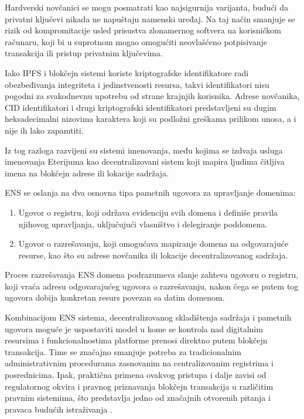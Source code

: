 Hardverski novčanici se mogu posmatrati kao najsigurnija varijanta, budući da privatni ključevi nikada ne napuštaju namenski uređaj. Na taj način smanjuje se rizik od kompromitacije usled prisustva zlonamernog softvera na korisničkom računaru, koji bi u suprotnom mogao omogućiti neovlašćeno potpisivanje transakcija ili pristup privatnim ključevima.

Iako IPFS i blokčejn sistemi koriste kriptografske identifikatore radi obezbeđivanja integriteta i jedinstvenosti resursa, takvi identifikatori nisu pogodni za svakodnevnu upotrebu od strane krajnjih korisnika. Adrese novčanika, CID identifikatori i drugi kriptografski identifikatori predstavljeni su dugim heksadecimalni nizovima karaktera koji su podložni greškama prilikom unosa, a i nije ih lako zapamtiti. 

Iz tog razloga razvijeni su sistemi imenovanja, među kojima se izdvaja usluga imenovanja Eterijuma  \cite{xia2021ethereum} kao decentralizovani sistem koji mapira ljudima čitljiva imena na blokčejn adrese ili lokacije sadržaja.

ENS se oslanja na dva osnovna tipa pametnih ugovora za upravljanje domenima:

\begin{enumerate}
\item Ugovor o registru, koji održava evidenciju svih domena i definiše pravila njihovog upravljanja, uključujući vlasništvo i delegiranje poddomena.

\item Ugovor o razrešavanju, koji omogućava mapiranje domena na odgovarajuće resurse, kao što su adrese novčanika ili lokacije decentralizovanog sadržaja.
\end{enumerate}

Proces razrešavanja ENS domena podrazumeva slanje zahteva ugovoru o registru, koji vraća adresu odgovarajućeg ugovora o razrešavanju, nakon čega se putem tog ugovora dobija konkretan resurs povezan sa datim domenom.

Kombinacijom ENS sistema, decentralizovanog skladištenja sadržaja i pametnih ugovora moguće je uspostaviti model u kome se kontrola nad digitalnim resursima i funkcionalnostima platforme prenosi direktno putem blokčejn transakcija. Time se značajno smanjuje potreba za tradicionalnim administrativnim procedurama zasnovanim na centralizovanim registrima i posrednicima. Ipak, praktična primena ovakvog pristupa i dalje zavisi od regulatornog okvira i pravnog priznavanja blokčejn transakcija u različitim pravnim sistemima, što predstavlja jedno od značajnih otvorenih pitanja i pravaca budućih istraživanja \cite{finck2018blockchain}.

